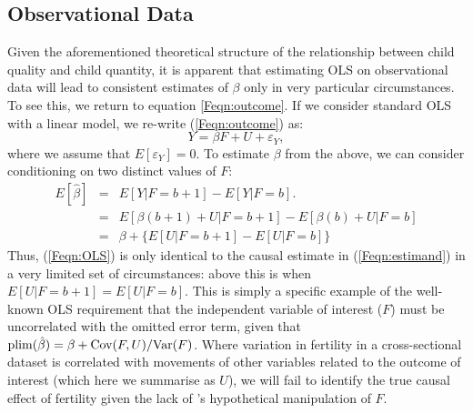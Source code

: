 \subsection{Observational Data}
Given the aforementioned theoretical structure of the relationship between 
child quality and child quantity, it is apparent that estimating OLS on 
observational data will lead to consistent estimates of $\beta$ only in very
particular circumstances. To see this, we return to equation \ref{Feqn:outcome}.
If we consider standard OLS with a linear model, we re-write 
(\ref{Feqn:outcome}) as:
\[
Y=\beta F + U + \varepsilon_Y,
\]
where we assume that $E[\varepsilon_Y]=0$.  To estimate $\beta$ from
the above, we can consider conditioning on two distinct values of $F$:
\begin{eqnarray}
E[\hat\beta] & = & E[Y|F=b+1]-E[Y|F=b]. \label{Feqn:OLS} \\
                      & = & E[\beta(b+1)+U|F=b+1] - E[\beta(b)+U|F=b] 
\nonumber \\
                      & = & \beta + \{E[U|F=b+1] - E[U|F=b]\} \nonumber
\end{eqnarray}
Thus, (\ref{Feqn:OLS}) is only identical to the causal estimate in 
(\ref{Feqn:estimand}) in a very limited set of circumstances: above this is when
$E[U|F=b+1] = E[U|F=b]$.  This is simply a specific example of 
the well-known OLS requirement that the independent variable of interest ($F$) 
must be uncorrelated with the omitted error term, given that 
$\operatorname{plim}(\hat\beta)=\beta+\mathrm{Cov}(F,U)/\mathrm{Var}(F)$.  Where variation in fertility
in a cross-sectional dataset is correlated with movements of other variables
related to the outcome of interest (which here we summarise as $U$), we will fail 
to identify the true causal effect of fertility given the lack of 
\citeauthor{Haavelmo1943}'s hypothetical manipulation of $F$. 

